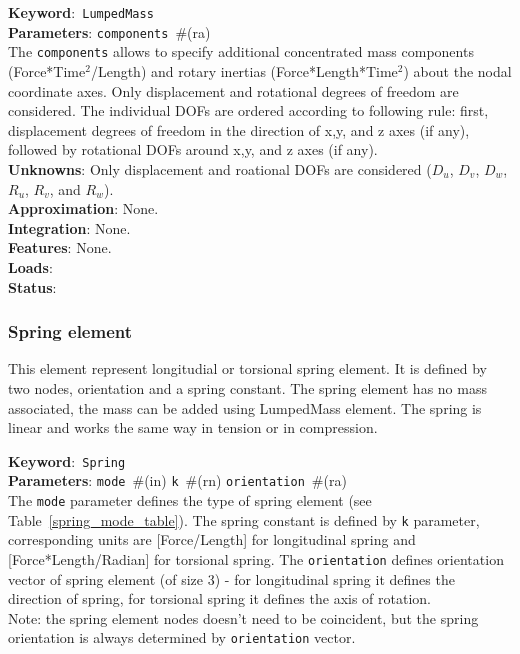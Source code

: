 \documentclass[a4paper]{article}
\newcommand{\descitem}[1]{{\noindent \textbf{#1}}:}
\newcommand{\elemkeyword}[1]{\descitem{Keyword}~\param{#1}} %
\newcommand{\param}[1]{\texttt{#1}} %
\newcommand{\field}[2]{\param{#1}~\#{\tiny(#2)}} %
\begin{document}
\elemkeyword{LumpedMass}\\
\descitem{Parameters} \field{components}{ra}\\
The \param{components} allows to specify additional concentrated mass components (Force*Time$^2$/Length) and rotary inertias (Force*Length*Time$^2$) about the nodal coordinate axes. Only displacement and rotational degrees of freedom are considered. The individual DOFs are ordered according to following rule: first, displacement degrees of freedom in the direction of x,y, and z axes (if any), followed by rotational DOFs around x,y, and z axes (if any).\\
\descitem{Unknowns}
Only displacement and roational DOFs are considered ($D_u$, $D_v$, $D_w$, $R_u$, $R_v$, and $R_w$).\\
\descitem{Approximation} None.\\
\descitem{Integration}
None.\\
\descitem{Features} None.\\
\descitem{Loads} \\
\descitem{Status} 

\subsubsection{Spring element}
This element represent longitudial or torsional spring element. It is defined by two nodes, orientation and a spring constant.
The spring element has no mass associated, the mass can be added using LumpedMass element. The spring is linear and works the same way in tension or in compression. 

\elemkeyword{Spring}\\
\descitem{Parameters} \field{mode}{in} \field{k}{rn} \field{orientation}{ra}\\
The \param{mode} parameter defines the type of spring element (see Table~\ref{spring_mode_table}). The spring constant is defined by \param{k} parameter, corresponding units are [Force/Length] for longitudinal spring and [Force*Length/Radian] for torsional spring. The \param{orientation} defines orientation vector of spring element (of size 3) - for longitudinal spring it defines the direction of spring, for torsional spring it defines the axis of rotation.\\
Note: the spring element nodes doesn't need to be coincident, but the spring orientation is always determined by \param{orientation} vector.
\end{document}
